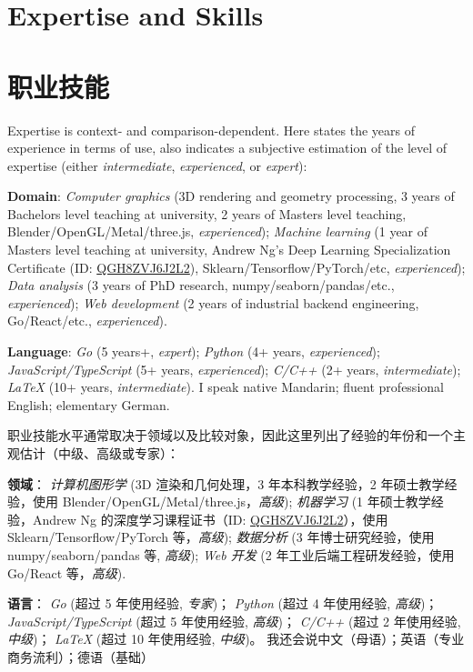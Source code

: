  {
  \section{\textbf{Expertise and Skills}}
}{
  \section{\textbf{职业技能}}
}
 {
  \small
  Expertise is context- and comparison-dependent. Here states the years of experience in terms of use, also indicates a subjective estimation of the level of expertise (either \emph{intermediate}, \emph{experienced}, or \emph{expert}):
  \resumeSubHeadingListStart
  \item{\textbf{Domain}:
  \emph{Computer graphics} (3D rendering and geometry processing, 3 years of Bachelors level teaching at university, 2 years of Masters level teaching, Blender/OpenGL/Metal/three.js, \emph{experienced});
  \emph{Machine learning} (1 year of Masters level teaching at university, Andrew Ng's Deep Learning Specialization Certificate (ID: \href{https://www.coursera.org/account/accomplishments/specialization/QGH8ZVJ6J2L2}{QGH8ZVJ6J2L2}), Sklearn/Tensorflow/PyTorch/etc, \emph{experienced});
  \emph{Data analysis} (3 years of PhD research, numpy/seaborn/pandas/etc., \emph{experienced});
  \emph{Web development} (2 years of industrial backend engineering, Go/React/etc., \emph{experienced}).
  }
  \item{\textbf{Language}:
  \emph{Go} (5 years+, \emph{expert});
  \emph{Python} (4+ years, \emph{experienced});
  \emph{JavaScript/TypeScript} (5+ years, \emph{experienced});
  \emph{C/C++} (2+ years, \emph{intermediate});
  \emph{\LaTeX} (10+ years, \emph{intermediate}).
  I speak native Mandarin; fluent professional English; elementary German.
  }
  \resumeSubHeadingListEnd
}{
  \small
  职业技能水平通常取决于领域以及比较对象，因此这里列出了经验的年份和一个主观估计（中级、高级或专家）：
  \resumeSubHeadingListStart
  \item{\textbf{领域}：
  \emph{计算机图形学} (3D 渲染和几何处理，3 年本科教学经验，2 年硕士教学经验，使用 Blender/OpenGL/Metal/three.js，\emph{高级});
  \emph{机器学习} (1 年硕士教学经验，Andrew Ng 的深度学习课程证书（ID: \href{https://www.coursera.org/account/accomplishments/specialization/QGH8ZVJ6J2L2}{QGH8ZVJ6J2L2}），使用 Sklearn/Tensorflow/PyTorch 等，\emph{高级});
  \emph{数据分析} (3 年博士研究经验，使用 numpy/seaborn/pandas 等, \emph{高级});
  \emph{Web 开发} (2 年工业后端工程研发经验，使用 Go/React 等，\emph{高级}).
  }
  \item{\textbf{语言}：
  \emph{Go} (超过 5 年使用经验, \emph{专家})；
  \emph{Python} (超过 4 年使用经验, \emph{高级})；
  \emph{JavaScript/TypeScript} (超过 5 年使用经验, \emph{高级})；
  \emph{C/C++} (超过 2 年使用经验, \emph{中级})；
  \emph{\LaTeX} (超过 10 年使用经验, \emph{中级})。
  我还会说中文（母语）；英语（专业商务流利）；德语（基础）
  }
  \resumeSubHeadingListEnd
}